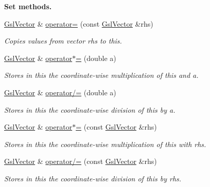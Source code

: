 \begin{Indent}{\bf Set methods.}\par
\begin{DoxyCompactItemize}
\item 
\hyperlink{class_q_u_e_s_o_1_1_gsl_vector}{Gsl\-Vector} \& \hyperlink{class_q_u_e_s_o_1_1_gsl_vector_aec9896bae67226f0f0d030d0de603956}{operator=} (const \hyperlink{class_q_u_e_s_o_1_1_gsl_vector}{Gsl\-Vector} \&rhs)
\begin{DoxyCompactList}\small\item\em Copies values from vector rhs to {\ttfamily this}. \end{DoxyCompactList}\item 
\hyperlink{class_q_u_e_s_o_1_1_gsl_vector}{Gsl\-Vector} \& \hyperlink{class_q_u_e_s_o_1_1_gsl_vector_abc5068be9af5256983cb2c5ecdcf8229}{operator$\ast$=} (double a)
\begin{DoxyCompactList}\small\item\em Stores in {\ttfamily this} the coordinate-\/wise multiplication of {\ttfamily this} and a. \end{DoxyCompactList}\item 
\hyperlink{class_q_u_e_s_o_1_1_gsl_vector}{Gsl\-Vector} \& \hyperlink{class_q_u_e_s_o_1_1_gsl_vector_a254b8ce11020280e7af0eea9b7626b4e}{operator/=} (double a)
\begin{DoxyCompactList}\small\item\em Stores in {\ttfamily this} the coordinate-\/wise division of {\ttfamily this} by a. \end{DoxyCompactList}\item 
\hyperlink{class_q_u_e_s_o_1_1_gsl_vector}{Gsl\-Vector} \& \hyperlink{class_q_u_e_s_o_1_1_gsl_vector_ac0046d85fddd8e9dbbebd19d1b61a9bd}{operator$\ast$=} (const \hyperlink{class_q_u_e_s_o_1_1_gsl_vector}{Gsl\-Vector} \&rhs)
\begin{DoxyCompactList}\small\item\em Stores in {\ttfamily this} the coordinate-\/wise multiplication of {\ttfamily this} with rhs. \end{DoxyCompactList}\item 
\hyperlink{class_q_u_e_s_o_1_1_gsl_vector}{Gsl\-Vector} \& \hyperlink{class_q_u_e_s_o_1_1_gsl_vector_a53644e0b71d5bff6117c5634bba66fe1}{operator/=} (const \hyperlink{class_q_u_e_s_o_1_1_gsl_vector}{Gsl\-Vector} \&rhs)
\begin{DoxyCompactList}\small\item\em Stores in {\ttfamily this} the coordinate-\/wise division of {\ttfamily this} by rhs. \end{DoxyCompactList}\item 

\end{DoxyCompactItemize}
\end{Indent}
